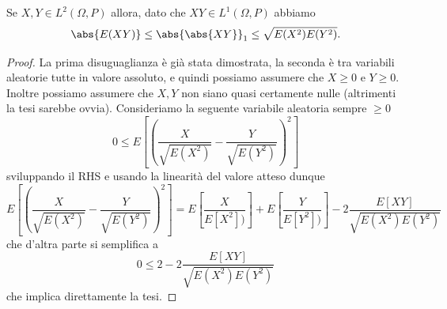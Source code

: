\documentclass[11pt]{scrartcl}
\begin{document}
	\begin{theorem}
		Se $X,Y\in L^2(\Omega,P)$ allora, dato che $XY\in L^1(\Omega,P)$ abbiamo
		$$\abs{E(XY)}\le \abs{\abs{XY}}_1\le \sqrt{E(X^2)E(Y^2)}.$$
	\end{theorem}
	\begin{proof}
		La prima disuguaglianza è già stata dimostrata, la seconda è tra variabili aleatorie tutte in valore assoluto, e quindi possiamo assumere che $X\ge 0$ e $Y\ge 0$. Inoltre possiamo assumere che $X,Y$ non siano quasi certamente nulle (altrimenti la tesi sarebbe ovvia). Consideriamo la seguente variabile aleatoria sempre $\ge 0$
		$$0\le E\left[\left(\frac{X}{\sqrt{E(X^2)}}-\frac{Y}{\sqrt{E(Y^2)}}\right)^2\right]$$
		sviluppando il RHS e usando la linearità del valore atteso dunque
		$$E\left[\left(\frac{X}{\sqrt{E(X^2)}}-\frac{Y}{\sqrt{E(Y^2)}}\right)^2\right]=E\left[\frac{X}{E\left[X^2\right])}\right]+E\left[\frac{Y}{E\left[Y^2\right])}\right]-2\frac{E\left[XY\right]}{\sqrt{E(X^2)E(Y^2)}}$$
		che d'altra parte si semplifica a 
		$$0\le 2-2\frac{E\left[XY\right]}{\sqrt{E(X^2)E(Y^2)}}$$
		che implica direttamente la tesi.
	\end{proof}
\end{document}
